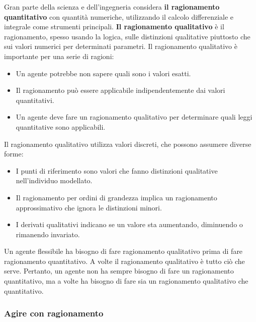 \documentclass[a4paper]{extarticle}
\begin{document}
Gran parte della scienza e dell'ingegneria considera \textbf{il ragionamento quantitativo} con quantità numeriche, utilizzando il calcolo differenziale e integrale come strumenti principali. \textbf{Il ragionamento qualitativo} è il ragionamento, spesso usando la logica, sulle distinzioni qualitative piuttosto che sui valori numerici per determinati parametri. Il ragionamento qualitativo è importante per una serie di ragioni:
\begin{itemize}
\item Un agente potrebbe non sapere quali sono i valori esatti.
\item Il ragionamento può essere applicabile indipendentemente dai valori quantitativi.
\item Un agente deve fare un ragionamento qualitativo per determinare quali leggi quantitative sono applicabili.
\end{itemize}
Il ragionamento qualitativo utilizza valori discreti, che possono assumere diverse forme:
\begin{itemize}
\item I punti di riferimento sono valori che fanno distinzioni qualitative nell'individuo modellato.
\item Il ragionamento per ordini di grandezza implica un ragionamento approssimativo che ignora le distinzioni minori.
\item I derivati qualitativi indicano se un valore sta aumentando, diminuendo o rimanendo invariato.
\end{itemize}

Un agente flessibile ha bisogno di fare ragionamento qualitativo prima di fare ragionamento quantitativo. A volte il ragionamento qualitativo è tutto ciò che serve. Pertanto, un agente non ha sempre bisogno di fare un ragionamento quantitativo, ma a volte ha bisogno di fare sia un ragionamento qualitativo che quantitativo.

\subsubsection{Agire con ragionamento}
\end{document}
